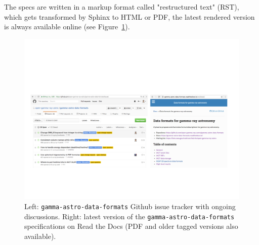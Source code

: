 The specs are written in a markup format called "restructured text" (RST),
which gets transformed by Sphinx to HTML or PDF, the latest rendered version is always available online (see Figure~\ref{fig:webpage}).

\begin{figure}[tb]
\centerline{\includegraphics[width=\textwidth]{figures/webpage}}
\caption{
Left: \texttt{gamma-astro-data-formats} Github issue tracker with ongoing discussions. Right: latest version of the \texttt{gamma-astro-data-formats} specifications on Read the Docs (PDF and older tagged versions also available).
}
\label{fig:webpage}
\end{figure}
